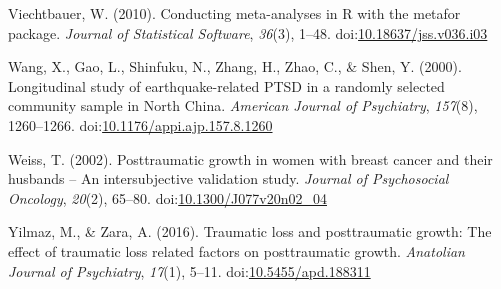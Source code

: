 \documentclass[man]{apa6}
\theoremstyle{definition}
\theoremstyle{definition}
\theoremstyle{definition}
\theoremstyle{remark}
\begin{document}
\hypertarget{ref-Viechtbauer2010}{}
Viechtbauer, W. (2010). Conducting meta-analyses in R with the metafor
package. \emph{Journal of Statistical Software}, \emph{36}(3), 1--48.
doi:\href{https://doi.org/10.18637/jss.v036.i03}{10.18637/jss.v036.i03}

\hypertarget{ref-Wang2000}{}
Wang, X., Gao, L., Shinfuku, N., Zhang, H., Zhao, C., \& Shen, Y.
(2000). Longitudinal study of earthquake-related PTSD in a randomly
selected community sample in North China. \emph{American Journal of
Psychiatry}, \emph{157}(8), 1260--1266.
doi:\href{https://doi.org/10.1176/appi.ajp.157.8.1260}{10.1176/appi.ajp.157.8.1260}

\hypertarget{ref-Weiss2002}{}
Weiss, T. (2002). Posttraumatic growth in women with breast cancer and
their husbands -- An intersubjective validation study. \emph{Journal of
Psychosocial Oncology}, \emph{20}(2), 65--80.
doi:\href{https://doi.org/10.1300/J077v20n02_04}{10.1300/J077v20n02\_04}

\hypertarget{ref-Yilmaz2016}{}
Yilmaz, M., \& Zara, A. (2016). Traumatic loss and posttraumatic growth:
The effect of traumatic loss related factors on posttraumatic growth.
\emph{Anatolian Journal of Psychiatry}, \emph{17}(1), 5--11.
doi:\href{https://doi.org/10.5455/apd.188311}{10.5455/apd.188311}
\end{document}
